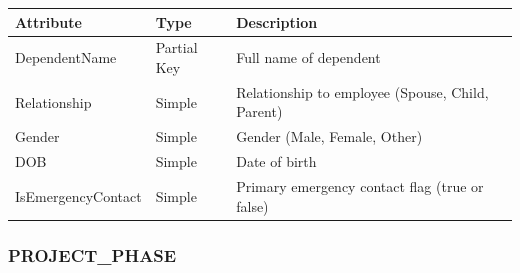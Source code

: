 \documentclass[a4paper,12pt]{report}
\newcounter{none} %
\begin{document}
{\def\LTcaptype{none} %
\begin{longtable}[]{@{}
  >{\raggedright\arraybackslash}p{}
  >{\raggedright\arraybackslash}p{}
  >{\raggedright\arraybackslash}p{}@{}}
\toprule\noalign{}
\begin{minipage}[b]{\linewidth}\raggedright
Attribute
\end{minipage} & \begin{minipage}[b]{\linewidth}\raggedright
Type
\end{minipage} & \begin{minipage}[b]{\linewidth}\raggedright
Description
\end{minipage} \\
\midrule\noalign{}
\endhead
\bottomrule\noalign{}
\endlastfoot
DependentName & Partial Key & Full name of dependent \\
Relationship & Simple & Relationship to employee (\allowbreak{}Spouse, Child, Parent) \\
Gender & Simple & Gender (\allowbreak{}Male, Female, Other) \\
DOB & Simple & Date of birth \\
IsEmergencyContact & Simple & Primary emergency contact flag (\allowbreak{}true or false) \\
\end{longtable}
}

\subsubsection{\texorpdfstring{PROJECT\texorpdfstring{\_\allowbreak{}}{_}PHASE}{PROJECTPHASE}}\label{project_phase}
\end{document}
